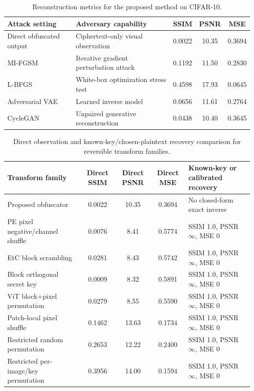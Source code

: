 \documentclass{ieeeaccess}
\newcommand{\rev}[1]{{\color{black}#1}}
\begin{document}
\begin{table}[t!]
\centering
\caption{\rev{Reconstruction metrics for the proposed method on CIFAR-10.}}
\label{tab:proposed_attack_metrics}
\begin{tabular}{p{} p{} c c c}
\toprule
\rev{\textbf{Attack setting}} & \rev{\textbf{Adversary capability}} & \rev{\textbf{SSIM}} & \rev{\textbf{PSNR}} & \rev{\textbf{MSE}} \\
\midrule
\rev{Direct obfuscated output} & \rev{Ciphertext-only visual observation} & \rev{0.0022} & \rev{10.35} & \rev{0.3694} \\
\rev{MI-FGSM} & \rev{Iterative gradient perturbation attack} & \rev{0.1192} & \rev{11.50} & \rev{0.2830} \\
\rev{L-BFGS} & \rev{White-box optimization stress test} & \rev{0.4598} & \rev{17.93} & \rev{0.0645} \\
\rev{Adversarial VAE} & \rev{Learned inverse model} & \rev{0.0656} & \rev{11.61} & \rev{0.2764} \\
\rev{CycleGAN} & \rev{Unpaired generative reconstruction} & \rev{0.0438} & \rev{10.40} & \rev{0.3645} \\
\bottomrule
\end{tabular}
\end{table}

\begin{table}[t!]
\centering
\caption{\rev{Direct observation and known-key/chosen-plaintext recovery comparison for reversible transform families.}}
\label{tab:reversible_recovery_metrics}
\begin{tabular}{p{} c c c p{}}
\toprule
\rev{\textbf{Transform family}} & \rev{\textbf{Direct SSIM}} & \rev{\textbf{Direct PSNR}} & \rev{\textbf{Direct MSE}} & \rev{\textbf{Known-key or calibrated recovery}} \\
\midrule
\rev{Proposed obfuscator} & \rev{0.0022} & \rev{10.35} & \rev{0.3694} & \rev{No closed-form exact inverse} \\
\rev{PE pixel negative/channel shuffle} & \rev{0.0076} & \rev{8.41} & \rev{0.5774} & \rev{SSIM 1.0, PSNR $\infty$, MSE 0} \\
\rev{EtC block scrambling} & \rev{0.0281} & \rev{8.43} & \rev{0.5742} & \rev{SSIM 1.0, PSNR $\infty$, MSE 0} \\
\rev{Block orthogonal secret key} & \rev{0.0009} & \rev{8.32} & \rev{0.5891} & \rev{SSIM 1.0, PSNR $\infty$, MSE 0} \\
\rev{ViT block+pixel permutation} & \rev{0.0279} & \rev{8.55} & \rev{0.5590} & \rev{SSIM 1.0, PSNR $\infty$, MSE 0} \\
\rev{Patch-local pixel shuffle} & \rev{0.1462} & \rev{13.63} & \rev{0.1734} & \rev{SSIM 1.0, PSNR $\infty$, MSE 0} \\
\rev{Restricted random permutation} & \rev{0.2653} & \rev{12.22} & \rev{0.2400} & \rev{SSIM 1.0, PSNR $\infty$, MSE 0} \\
\rev{Restricted per-image/key permutation} & \rev{0.3956} & \rev{14.00} & \rev{0.1594} & \rev{SSIM 1.0, PSNR $\infty$, MSE 0} \\
\bottomrule
\end{tabular}
\end{table}
\end{document}
